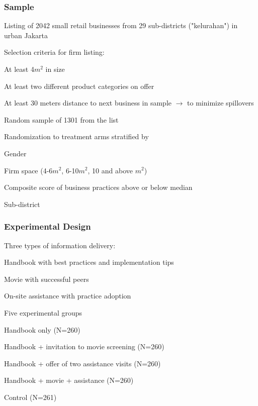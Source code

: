 \documentclass[hideothersubsections, usenames,dvipsnames,11pt]{beamer}
\newenvironment{itemize_2pt}{\itemize\addtolength{\itemsep}{2pt}}{\enditemize}
\newenvironment{enumerate_2pt}{\enumerate\addtolength{\itemsep}{2pt}}{\endenumerate}
\begin{document}
\begin{frame}
\frametitle{Sample}
\begin{itemize_2pt}
\item Listing of 2042 small retail businesses from 29 sub-districts ("kelurahan") in urban Jakarta
\item Selection criteria for firm listing:
	\begin{itemize_2pt}
	\item At least 4$m^{2}$ in size
	\item At least two different product categories on offer
	\item At least 30 meters distance to next business in sample $\rightarrow$ to minimize spillovers
	\end{itemize_2pt}
\item Random sample of 1301 from the list
\item Randomization to treatment arms stratified by
	\begin{itemize_2pt}
	\item Gender
	\item Firm space (4-6$m^2$, 6-10$m^2$, 10 and above $m^2$)
	\item Composite score of business practices above or below median
	\item Sub-district
	\end{itemize_2pt}
\end{itemize_2pt}
\end{frame}


\begin{frame}
\frametitle{Experimental Design}

	Three types of information delivery:
		\begin{enumerate_2pt}
			\item \textcolor{bdf}{Handbook} with best practices and implementation tips
			\item \textcolor{bdf}{Movie} with successful peers
			\item \textcolor{bdf}{On-site assistance} with practice adoption
		\end{enumerate_2pt}
	\vspace{0.1in}
	
	Five experimental groups
    	\begin{enumerate_2pt}
        	\item \textcolor{bdf}{Handbook} only (N=260)
        	\item \textcolor{bdf}{Handbook} + invitation to \textcolor{bdf}{movie} screening (N=260)
        	\item \textcolor{bdf}{Handbook} + offer of two \textcolor{bdf}{assistance} visits (N=260)
        	\item \textcolor{bdf}{Handbook} + \textcolor{bdf}{movie} + \textcolor{bdf}{assistance} (N=260)
       		\item Control (N=261)
      	\end{enumerate_2pt}
\end{frame}
\end{document}

